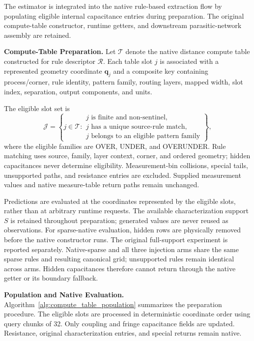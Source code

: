 \documentclass[conference,9pt,letterpaper]{IEEEtran}
\begin{document}
The estimator is integrated into the native
rule-based extraction flow by populating eligible
internal capacitance entries during preparation.
The original compute-table constructor, runtime
getters, and downstream parasitic-network assembly
are retained.

\textbf{Compute-Table Preparation.}
Let $\mathcal{T}$ denote the native distance
compute table constructed for rule descriptor
$\mathcal{R}$. Each table slot $j$ is associated
with a represented geometry coordinate
$\mathbf{q}_j$ and a composite key containing
process/corner, rule identity, pattern family,
routing layers, mapped width, slot index,
separation, output components, and units.

The eligible slot set is
\begin{equation}
\mathcal{J}
=
\left\{
j\in\mathcal{T}:
\begin{array}{l}
j\text{ is finite and non-sentinel},\\
j\text{ has a unique source-rule match},\\
j\text{ belongs to an eligible pattern family}
\end{array}
\right\},
\label{eq:eligible_slots}
\end{equation}
where the eligible families are OVER, UNDER,
and OVERUNDER. Rule matching uses source, family, layer context, corner,
and ordered geometry; hidden capacitances never determine eligibility. Measurement-bin collisions,
special tails, unsupported paths, and resistance
entries are excluded. Supplied measurement values
and native measure-table return paths remain
unchanged.

Predictions are evaluated at the coordinates
represented by the eligible slots, rather than
at arbitrary runtime requests. The available characterization support $S$ is retained throughout
preparation; generated values are never reused as observations.
For sparse-native evaluation, hidden rows are physically removed before
the native constructor runs. The original full-support experiment is
reported separately. Native-sparse and all three injection arms share
the same sparse rules and resulting canonical grid; unsupported rules
remain identical across arms. Hidden capacitances therefore cannot return
through the native getter or its boundary fallback.

\textbf{Population and Native Evaluation.}
Algorithm~\ref{alg:compute_table_population} summarizes
the preparation procedure. The eligible slots
are processed in deterministic coordinate order
using query chunks of 32. Only coupling and
fringe capacitance fields are updated. Resistance,
original characterization entries, and special
returns remain native.
\end{document}
